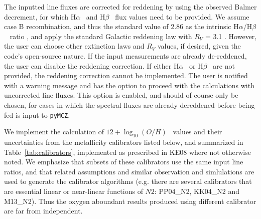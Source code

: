 \documentclass{emulateapj} \usepackage{amsmath} \usepackage{float}
\newcommand{\oxabinline}{\ensuremath{12 + \log_{10}(O/H)}}
\newcommand{\ha}{\ensuremath{\mathrm{H}\alpha}}
\newcommand{\hb}{\ensuremath{\mathrm{H}\beta}}
\begin{document}
The inputted line fluxes are corrected for reddening by using the
observed Balmer decrement, for which \ha~ and \hb~ flux values need to
be provided. We assume case B recombination, and thus the standard
value of 2.86 as the intrinsic \ha/\hb~ ratio \citep{osterbrock89},
and apply the standard Galactic reddening law with $R_V$ = 3.1
\citep{cardelli89}. However, the user can choose other extinction laws
and $R_V$ values, if desired, given the code's open-source nature. If
the input measurements are already de-reddened, the user can disable
the reddening correction. If either \ha~ or \hb~ are not provided, the
reddening correction cannot be implemented. The user is notified with
a warning message and has the option to proceed with the calculations
with uncorrected line fluxes. This option is enabled, and should of course only be chosen, for cases in which the spectral fluxes are already dereddened before being fed is input to \verb=pyMCZ=.

We implement the calculation of \oxabinline~ values and their uncertainties from the
metallicity calibrators listed below, and summarized in
Table~\ref{tab:calibrators}, implemented as prescribed in
KE08 where not otherwise noted. We emphasize that subsets of
these calibrators use the same input line ratios, and that related
assumptions and similar observation and simlulations are used to
generate the calibrator algorithms (e.g. there are several calibrators
that are essential linear or near-linear functions of $N2$: PP04\_N2,
KK04\_N2 and M13\_N2). Thus the oxygen aboundant results produced
using different calibrator are far from independent.
\end{document}

